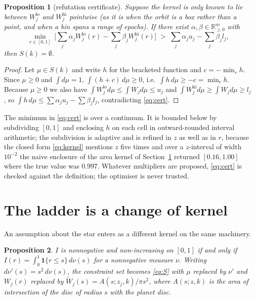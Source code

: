 \documentclass[11pt]{article}
\newtheorem{proposition}{Proposition}
\newcommand{\R}{\mathbb{R}}
\begin{document}
\begin{proposition}[refutation certificate]\label{prop:farkas}
Suppose the kernel is only known to lie between $W^{\mathrm{lo}}_j$ and
$W^{\mathrm{hi}}_j$ pointwise (as it is when the orbit is a box rather than a
point, and when a bin spans a range of epochs). If there exist
$\alpha,\beta\in\R_{\ge0}^m$ with
\begin{equation}
\min_{r\in[0,1]}\ \Big[\sum_j \alpha_j W^{\mathrm{lo}}_j(r)-\sum_j \beta_j W^{\mathrm{hi}}_j(r)\Big]
\;>\;\sum_j \alpha_j u_j-\sum_j \beta_j l_j ,
\label{eq:cert}
\end{equation}
then $S(k)=\emptyset$.
\end{proposition}

\begin{proof}
Let $\mu\in S(k)$ and write $h$ for the bracketed function and $c=-\min_r h$.
Since $\mu\ge0$ and $\int d\mu=1$, $\int (h+c)\,d\mu\ge0$, i.e.\
$\int h\,d\mu\ge -c=\min_r h$. Because $\mu\ge0$ we also have
$\int W^{\mathrm{lo}}_j d\mu\le\int W_j d\mu\le u_j$ and
$\int W^{\mathrm{hi}}_j d\mu\ge \int W_j d\mu\ge l_j$, so
$\int h\,d\mu\le\sum\alpha_j u_j-\sum\beta_j l_j$, contradicting \eqref{eq:cert}.
\end{proof}

The minimum in \eqref{eq:cert} is over a continuum. It is bounded below by
subdividing $[0,1]$ and enclosing $h$ on each cell in outward-rounded interval
arithmetic; the subdivision is adaptive and is refined in $z$ as well as in $r$,
because the closed form \eqref{eq:kernel} mentions $z$ five times and over a
$z$-interval of width $10^{-2}$ the naive enclosure of the area kernel of
Section~\ref{sec:ladder} returned $[0.16,1.00]$ where the true value was $0.997$.
Whatever multipliers are proposed, \eqref{eq:cert} is checked against the
definition; the optimiser is never trusted.

\section{The ladder is a change of kernel}\label{sec:ladder}

An assumption about the star enters as a different kernel on the same machinery.

\begin{proposition}\label{prop:mono}
$I$ is nonnegative and non-increasing on $[0,1]$ if and only if
$I(r)=\int_0^1 \mathbf 1\{r\le s\}\,d\nu(s)$ for a nonnegative measure $\nu$.
Writing $d\nu'(s)=s^2\,d\nu(s)$, the constraint set becomes \eqref{eq:S} with
$\mu$ replaced by $\nu'$ and $W_j(r)$ replaced by
$\widetilde W_j(s)=A(s;z_j,k)/\pi s^2$, where $A(s;z,k)$ is the area of
intersection of the disc of radius $s$ with the planet disc.
\end{proposition}
\end{document}
